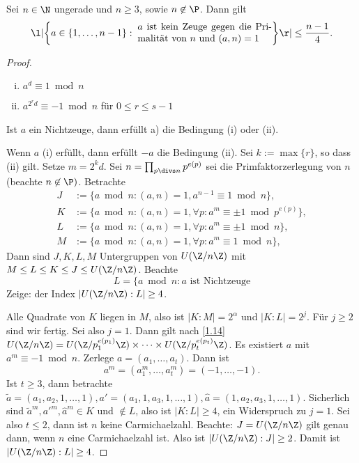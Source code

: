 \begin{prop} \label{3.21}
	Sei $n \in \N$ ungerade und $n \ge 3$, sowie $n \not\in \P$.
	Dann gilt
	\[
		\l| \bigg\{ a \in \{1, \dotsc, n-1\} : \; \parbox{0.4\textwidth}{ $a$ ist kein Zeuge gegen die Primalität von $n$ und $(a,n) = 1$} \bigg\} \r| \le \dfrac{n-1}4.
	\]
	\begin{proof}
		\begin{enumerate}[(i)]
			\item
				$a^d \equiv 1 \bmod n$
			\item
				$a^{2^r d} \equiv -1 \bmod n$ für $0 \le r \le s-1$
		\end{enumerate}
		Ist $a$ ein Nichtzeuge, dann erfüllt a) die Bedingung (i) oder (ii).

		Wenn $a$ (i) erfüllt, dann erfüllt $-a$ die Bedingung (ii).
		Sei $k := \max\{r\}$, so dass (ii) gilt.
		Setze $m = 2^k d$.
		Sei $n = \prod_{p\divs n} p^{e(p)}$ sei die Primfaktorzerlegung von $n$ (beachte $n \not\in \P)$.
		Betrachte
		\begin{align*}
			J &:= \{ a \bmod n : (a,n) = 1, a^{n-1} \equiv 1 \bmod n \}, \\
			K &:= \{ a \bmod n : (a,n) = 1, \forall p : a^{m} \equiv \pm 1 \bmod p^{e(p)} \}, \\
			L &:= \{ a \bmod n : (a,n) = 1, \forall p : a^{m} \equiv \pm 1 \bmod n \}, \\
			M &:= \{ a \bmod n : (a,n) = 1, \forall p : a^{m} \equiv 1 \bmod n \},
		\end{align*}
		Dann sind $J, K, L, M$ Untergruppen von $U(\Z / n \Z)$ mit $M \le L \le K \le J \le U(\Z / n\Z)$.
		Beachte
		\[
			L = \{ a \bmod n : \text{$a$ ist Nichtzeuge}
		\]
		Zeige: der Index $|U(\Z / n\Z) : L | \ge 4$.

		Alle Quadrate von $K$ liegen in $M$, also ist $|K : M| = 2^\alpha$ und $|K : L| = 2^j$.
		Für $j \ge 2$ sind wir fertig.
		Sei also $j = 1$.
		Dann gilt nach \ref{1.14} $U(\Z/n\Z) = U(\Z/p_1^{e(p_1)}\Z) \times \dotsb \times U(\Z/p_t^{e(p_t)}\Z)$.
		Es existiert $a$ mit $a^m \equiv -1 \bmod n$.
		Zerlege $a = (a_1, \dotsc, a_t)$.
		Dann ist
		\[
			a^m = (a_1^m, \dotsc, a_t^m) = (-1, \dotsc, -1).
		\]
		Ist $t \ge 3$, dann betrachte $\tilde a = (a_1, a_2, 1, \dotsc, 1), a' = (a_1, 1, a_3, 1, \dotsc, 1), \hat a = (1, a_2, a_3, 1, \dotsc, 1)$.
		Sicherlich sind $\tilde a^m, a'^m, \hat a^m \in K$ und $\not\in L$, also ist $|K : L| \ge 4$, ein Widerspruch zu $j = 1$.
		Sei also $t \le 2$, dann ist $n$ keine Carmichaelzahl.
		Beachte: $J = U(\Z / n\Z)$ gilt genau dann, wenn $n$ eine Carmichaelzahl ist.
		Also ist $| U(\Z / n\Z) : J| \ge 2$.
		Damit ist $| U(\Z / n\Z) : L| \ge 4$.


\end{proof}
\end{prop}
